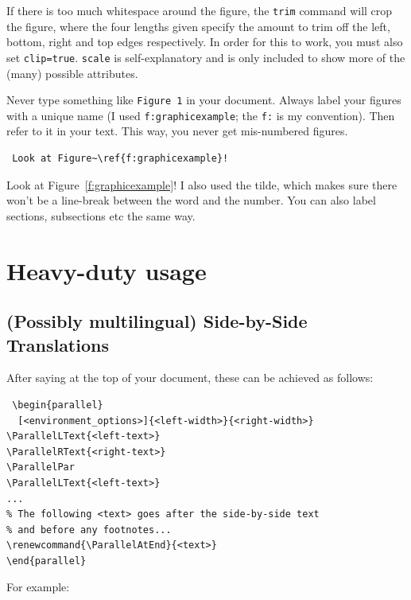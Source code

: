 \documentclass{SMR}
\begin{document}
If there is too much whitespace around the figure, the \texttt{trim} command will
crop the figure, where the four lengths given specify the amount to trim off the 
left, bottom, right and top edges respectively. In order for this to work, you must
also set \texttt{clip=true}. \texttt{scale} is self-explanatory and is only included
to show more of the (many) possible attributes.


Never type something like \texttt{Figure 1} in your document.
Always label your figures with a unique name (I used \texttt{f:graphicexample};
the \texttt{f:} is my convention). Then refer to it in your text.
This way, you never get mis-numbered figures.

\begin{verbatim}
 Look at Figure~\ref{f:graphicexample}!
\end{verbatim}

Look at Figure~\ref{f:graphicexample}!
I also used the tilde, which makes sure there won't be a line-break between
the word and the number. You can also label sections, subsections etc
the same way.

\section{Heavy-duty usage}
\subsection{(Possibly multilingual) Side-by-Side Translations}
After saying  at the top of your document,
these can be achieved as follows:

\begin{verbatim}
 \begin{parallel}
  [<environment_options>]{<left-width>}{<right-width>}
\ParallelLText{<left-text>}
\ParallelRText{<right-text>}
\ParallelPar
\ParallelLText{<left-text>}
...
% The following <text> goes after the side-by-side text
% and before any footnotes...
\renewcommand{\ParallelAtEnd}{<text>}
\end{parallel}
\end{verbatim}

For example:
\end{document}
